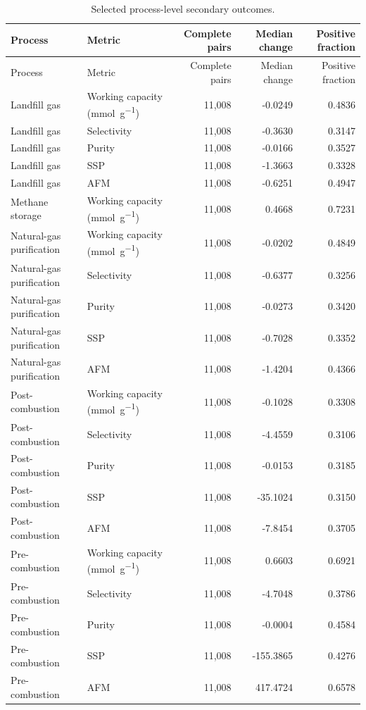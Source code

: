 \documentclass[11pt,a4paper]{article}
\begin{document}
\begingroup
\small
\setlength{\tabcolsep}{3pt}
\begin{longtable}{p{}p{}rrr}
\caption{Selected process-level secondary outcomes.}\label{tab:S11}\\
\toprule
Process & Metric & Complete pairs & Median change & Positive fraction \\
\midrule
\endfirsthead
\toprule
Process & Metric & Complete pairs & Median change & Positive fraction \\
\midrule
\endhead
Landfill gas & Working capacity (\si{\milli\mole\per\gram}) & 11,008 & -0.0249 & 0.4836 \\
Landfill gas & Selectivity & 11,008 & -0.3630 & 0.3147 \\
Landfill gas & Purity & 11,008 & -0.0166 & 0.3527 \\
Landfill gas & SSP & 11,008 & -1.3663 & 0.3328 \\
Landfill gas & AFM & 11,008 & -0.6251 & 0.4947 \\
Methane storage & Working capacity (\si{\milli\mole\per\gram}) & 11,008 & 0.4668 & 0.7231 \\
Natural-gas purification & Working capacity (\si{\milli\mole\per\gram}) & 11,008 & -0.0202 & 0.4849 \\
Natural-gas purification & Selectivity & 11,008 & -0.6377 & 0.3256 \\
Natural-gas purification & Purity & 11,008 & -0.0273 & 0.3420 \\
Natural-gas purification & SSP & 11,008 & -0.7028 & 0.3352 \\
Natural-gas purification & AFM & 11,008 & -1.4204 & 0.4366 \\
Post-combustion & Working capacity (\si{\milli\mole\per\gram}) & 11,008 & -0.1028 & 0.3308 \\
Post-combustion & Selectivity & 11,008 & -4.4559 & 0.3106 \\
Post-combustion & Purity & 11,008 & -0.0153 & 0.3185 \\
Post-combustion & SSP & 11,008 & -35.1024 & 0.3150 \\
Post-combustion & AFM & 11,008 & -7.8454 & 0.3705 \\
Pre-combustion & Working capacity (\si{\milli\mole\per\gram}) & 11,008 & 0.6603 & 0.6921 \\
Pre-combustion & Selectivity & 11,008 & -4.7048 & 0.3786 \\
Pre-combustion & Purity & 11,008 & -0.0004 & 0.4584 \\
Pre-combustion & SSP & 11,008 & -155.3865 & 0.4276 \\
Pre-combustion & AFM & 11,008 & 417.4724 & 0.6578 \\
\bottomrule
\end{longtable}
\endgroup
\end{document}

